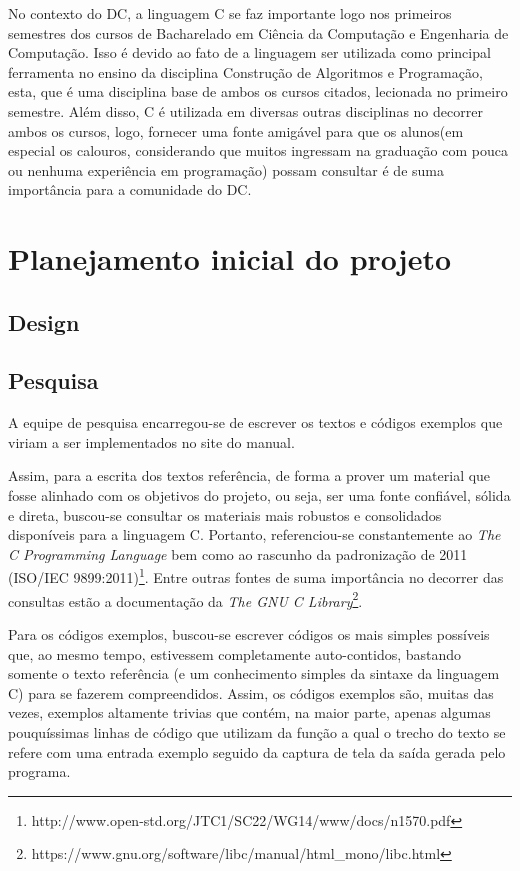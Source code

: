 \documentclass{article}
\begin{document}
No contexto do \ac{DC}, a linguagem C se faz importante logo nos primeiros semestres dos cursos de Bacharelado em Ciência da Computação e Engenharia de Computação. Isso é devido ao fato de a linguagem ser utilizada como principal ferramenta no ensino da disciplina Construção de Algoritmos e Programação, esta, que é uma disciplina base de ambos os cursos citados, lecionada no primeiro semestre. Além disso, C é utilizada em diversas outras disciplinas no decorrer ambos os cursos, logo, fornecer uma fonte amigável para que os alunos(em especial os calouros, considerando que muitos ingressam na graduação com pouca ou nenhuma experiência em programação) possam consultar é de suma importância para a comunidade do \ac{DC}.

\section{Planejamento inicial do projeto}
\subsection{Design}
\subsection{Pesquisa}
A equipe de pesquisa encarregou-se de escrever os textos e códigos exemplos que viriam a ser implementados no site do manual.

Assim, para a escrita dos textos referência, de forma a prover um material que fosse alinhado com os objetivos do projeto, ou seja, ser uma fonte confiável, sólida e direta, buscou-se consultar os materiais mais robustos e consolidados disponíveis para a linguagem C. Portanto, referenciou-se constantemente ao \textit{The C Programming Language} bem como ao rascunho da padronização de 2011 (ISO/IEC 9899:2011)\footnote{http://www.open-std.org/JTC1/SC22/WG14/www/docs/n1570.pdf}. Entre outras fontes de suma importância no decorrer das consultas estão a documentação da \textit{The GNU C Library}\footnote{https://www.gnu.org/software/libc/manual/html\_mono/libc.html}.

Para os códigos exemplos, buscou-se escrever códigos os mais simples possíveis que, ao mesmo tempo, estivessem completamente auto-contidos, bastando somente o texto referência (e um conhecimento simples da sintaxe da linguagem C) para se fazerem compreendidos. Assim, os códigos exemplos são, muitas das vezes, exemplos altamente trivias que contém, na maior parte, apenas algumas pouquíssimas linhas de código que utilizam da função a qual o trecho do texto se refere com uma entrada exemplo seguido da captura de tela da saída gerada pelo programa.
\end{document}
